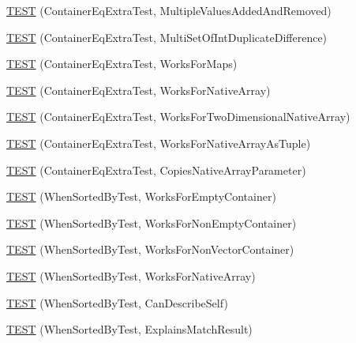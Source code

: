 \begin{DoxyCompactItemize}
\item 
\hyperlink{namespacetesting_1_1gmock__matchers__test_acb0d845f828c2d5a551e4db0611f2853}{T\+E\+ST} (Container\+Eq\+Extra\+Test, Multiple\+Values\+Added\+And\+Removed)
\item 
\hyperlink{namespacetesting_1_1gmock__matchers__test_a6bce9564bb713ffb690b776e35d2e6cf}{T\+E\+ST} (Container\+Eq\+Extra\+Test, Multi\+Set\+Of\+Int\+Duplicate\+Difference)
\item 
\hyperlink{namespacetesting_1_1gmock__matchers__test_ab7bcbeeeb23094cff6f2882304c05134}{T\+E\+ST} (Container\+Eq\+Extra\+Test, Works\+For\+Maps)
\item 
\hyperlink{namespacetesting_1_1gmock__matchers__test_ae5e5420340c8cf91d24af11feca669b0}{T\+E\+ST} (Container\+Eq\+Extra\+Test, Works\+For\+Native\+Array)
\item 
\hyperlink{namespacetesting_1_1gmock__matchers__test_a3cf0d2f2c08e34ca0b7e11ff27b4a7ca}{T\+E\+ST} (Container\+Eq\+Extra\+Test, Works\+For\+Two\+Dimensional\+Native\+Array)
\item 
\hyperlink{namespacetesting_1_1gmock__matchers__test_a94e4a2a02cde84ac51e37cda1813bc77}{T\+E\+ST} (Container\+Eq\+Extra\+Test, Works\+For\+Native\+Array\+As\+Tuple)
\item 
\hyperlink{namespacetesting_1_1gmock__matchers__test_af7a978384d567d133240fb1899ec1658}{T\+E\+ST} (Container\+Eq\+Extra\+Test, Copies\+Native\+Array\+Parameter)
\item 
\hyperlink{namespacetesting_1_1gmock__matchers__test_a9d88fbc6e2d01b66a1c10b192b25a802}{T\+E\+ST} (When\+Sorted\+By\+Test, Works\+For\+Empty\+Container)
\item 
\hyperlink{namespacetesting_1_1gmock__matchers__test_a3095e5533ec12a67377dec6b0769d9a8}{T\+E\+ST} (When\+Sorted\+By\+Test, Works\+For\+Non\+Empty\+Container)
\item 
\hyperlink{namespacetesting_1_1gmock__matchers__test_a24d3caacabfef918b7a5b9dacc5e3a66}{T\+E\+ST} (When\+Sorted\+By\+Test, Works\+For\+Non\+Vector\+Container)
\item 
\hyperlink{namespacetesting_1_1gmock__matchers__test_a33b65fc6db83270b5c29073dbbf69c4e}{T\+E\+ST} (When\+Sorted\+By\+Test, Works\+For\+Native\+Array)
\item 
\hyperlink{namespacetesting_1_1gmock__matchers__test_afc2d1e86837d8e3103748cb2e96b61c3}{T\+E\+ST} (When\+Sorted\+By\+Test, Can\+Describe\+Self)
\item 
\hyperlink{namespacetesting_1_1gmock__matchers__test_ada0850ab21beccb47802aab36c06d163}{T\+E\+ST} (When\+Sorted\+By\+Test, Explains\+Match\+Result)

\end{DoxyCompactItemize}

